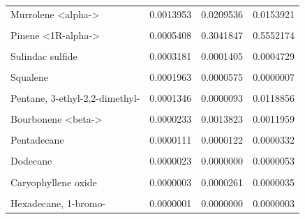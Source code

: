 \documentclass[12pt,final,CPage]{ufthesis}
\begin{document}
{\begin{table}
{\begin{tabular}[t]{lrrr}
  \addlinespace
  Murrolene <alpha-> & 0.0013953 & 0.0209536 & 0.0153921\\
  \cellcolor{gray!6}{2-Hexen-1-ol, acetate, (E)-} & \cellcolor{gray!6}{0.0009637} & \cellcolor{gray!6}{0.0778123} & \cellcolor{gray!6}{0.0032888}\\
  Pinene <1R-alpha-> & 0.0005408 & 0.3041847 & 0.5552174\\
  \cellcolor{gray!6}{Decanal} & \cellcolor{gray!6}{0.0004416} & \cellcolor{gray!6}{0.0358075} & \cellcolor{gray!6}{0.0548420}\\
  Sulindac sulfide & 0.0003181 & 0.0001405 & 0.0004729\\
  \addlinespace
  \cellcolor{gray!6}{p-Cymene} & \cellcolor{gray!6}{0.0002002} & \cellcolor{gray!6}{0.0000645} & \cellcolor{gray!6}{0.0002396}\\
  Squalene & 0.0001963 & 0.0000575 & 0.0000007\\
  \cellcolor{gray!6}{Nonanal} & \cellcolor{gray!6}{0.0001381} & \cellcolor{gray!6}{0.0000000} & \cellcolor{gray!6}{0.0000506}\\
  Pentane, 3-ethyl-2,2-dimethyl- & 0.0001346 & 0.0000093 & 0.0118856\\
  \cellcolor{gray!6}{Carene <delta-3>} & \cellcolor{gray!6}{0.0000350} & \cellcolor{gray!6}{0.0008066} & \cellcolor{gray!6}{0.0002344}\\
  \addlinespace
  Bourbonene <beta-> & 0.0000233 & 0.0013823 & 0.0011959\\
  \cellcolor{gray!6}{Cadina-1,4-diene <trans->} & \cellcolor{gray!6}{0.0000136} & \cellcolor{gray!6}{0.0000000} & \cellcolor{gray!6}{0.0000238}\\
  Pentadecane & 0.0000111 & 0.0000122 & 0.0000332\\
  \cellcolor{gray!6}{Acetic acid, hexyl ester} & \cellcolor{gray!6}{0.0000026} & \cellcolor{gray!6}{0.0000000} & \cellcolor{gray!6}{0.0000045}\\
  Dodecane & 0.0000023 & 0.0000000 & 0.0000053\\
  \addlinespace
  \cellcolor{gray!6}{Cubebene <beta->} & \cellcolor{gray!6}{0.0000015} & \cellcolor{gray!6}{0.0000606} & \cellcolor{gray!6}{0.0000145}\\
  Caryophyllene oxide & 0.0000003 & 0.0000261 & 0.0000035\\
  \cellcolor{gray!6}{Zonarene} & \cellcolor{gray!6}{0.0000002} & \cellcolor{gray!6}{0.0000075} & \cellcolor{gray!6}{0.0000036}\\
  Hexadecane, 1-bromo- & 0.0000001 & 0.0000000 & 0.0000003\\

\end{tabular}}
\end{table}}
\end{document}
